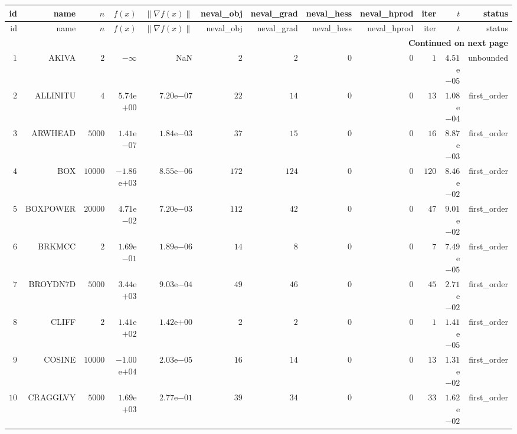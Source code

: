\begin{longtable}{rrrrrrrrrrrr}
  \hline
  id & name & \(n\) & \(f(x)\) & \(\|\nabla f(x)\|\) & neval\_obj & neval\_grad & neval\_hess & neval\_hprod & iter & \(t\) & status \\\hline
  \endfirsthead
  \hline
  id & name & \(n\) & \(f(x)\) & \(\|\nabla f(x)\|\) & neval\_obj & neval\_grad & neval\_hess & neval\_hprod & iter & \(t\) & status \\\hline
  \endhead
  \hline
  \multicolumn{12}{r}{{\bfseries Continued on next page}}\\
  \hline
  \endfoot
  \endlastfoot
  \(     1\) & AKIVA & \(     2\) & \(-\infty\) &       NaN & \(     2\) & \(     2\) & \(     0\) & \(     0\) & \(     1\) & \( 4.51\)e\(-05\) & unbounded \\
  \(     2\) & ALLINITU & \(     4\) & \( 5.74\)e\(+00\) & \( 7.20\)e\(-07\) & \(    22\) & \(    14\) & \(     0\) & \(     0\) & \(    13\) & \( 1.08\)e\(-04\) & first\_order \\
  \(     3\) & ARWHEAD & \(  5000\) & \( 1.41\)e\(-07\) & \( 1.84\)e\(-03\) & \(    37\) & \(    15\) & \(     0\) & \(     0\) & \(    16\) & \( 8.87\)e\(-03\) & first\_order \\
  \(     4\) & BOX & \( 10000\) & \(-1.86\)e\(+03\) & \( 8.55\)e\(-06\) & \(   172\) & \(   124\) & \(     0\) & \(     0\) & \(   120\) & \( 8.46\)e\(-02\) & first\_order \\
  \(     5\) & BOXPOWER & \( 20000\) & \( 4.71\)e\(-02\) & \( 7.20\)e\(-03\) & \(   112\) & \(    42\) & \(     0\) & \(     0\) & \(    47\) & \( 9.01\)e\(-02\) & first\_order \\
  \(     6\) & BRKMCC & \(     2\) & \( 1.69\)e\(-01\) & \( 1.89\)e\(-06\) & \(    14\) & \(     8\) & \(     0\) & \(     0\) & \(     7\) & \( 7.49\)e\(-05\) & first\_order \\
  \(     7\) & BROYDN7D & \(  5000\) & \( 3.44\)e\(+03\) & \( 9.03\)e\(-04\) & \(    49\) & \(    46\) & \(     0\) & \(     0\) & \(    45\) & \( 2.71\)e\(-02\) & first\_order \\
  \(     8\) & CLIFF & \(     2\) & \( 1.41\)e\(+02\) & \( 1.42\)e\(+00\) & \(     2\) & \(     2\) & \(     0\) & \(     0\) & \(     1\) & \( 1.41\)e\(-05\) & first\_order \\
  \(     9\) & COSINE & \( 10000\) & \(-1.00\)e\(+04\) & \( 2.03\)e\(-05\) & \(    16\) & \(    14\) & \(     0\) & \(     0\) & \(    13\) & \( 1.31\)e\(-02\) & first\_order \\
  \(    10\) & CRAGGLVY & \(  5000\) & \( 1.69\)e\(+03\) & \( 2.77\)e\(-01\) & \(    39\) & \(    34\) & \(     0\) & \(     0\) & \(    33\) & \( 1.62\)e\(-02\) & first\_order \\

\end{longtable}
